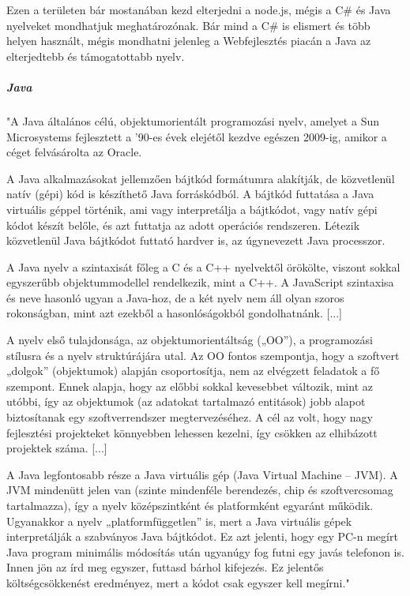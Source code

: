 Ezen a területen bár mostanában kezd elterjedni a node.js, mégis a C\# és Java nyelveket mondhatjuk meghatározónak. Bár mind a C\# is elismert és több helyen használt, mégis mondhatni jelenleg a Webfejlesztés piacán a Java az elterjedtebb és támogatottabb nyelv.

\subparagraph{Java}

"A Java általános célú, objektumorientált programozási nyelv, amelyet a Sun Microsystems fejlesztett a ’90-es évek elejétől kezdve egészen 2009-ig, amikor a céget felvásárolta az Oracle.

A Java alkalmazásokat jellemzően bájtkód formátumra alakítják, de közvetlenül natív (gépi) kód is készíthető Java forráskódból. A bájtkód futtatása a Java virtuális géppel történik, ami vagy interpretálja a bájtkódot, vagy natív gépi kódot készít belőle, és azt futtatja az adott operációs rendszeren. Létezik közvetlenül Java bájtkódot futtató hardver is, az úgynevezett Java processzor.

A Java nyelv a szintaxisát főleg a C és a C++ nyelvektől örökölte, viszont sokkal egyszerűbb objektummodellel rendelkezik, mint a C++. A JavaScript szintaxisa és neve hasonló ugyan a Java-hoz, de a két nyelv nem áll olyan szoros rokonságban, mint azt ezekből a hasonlóságokból gondolhatnánk. [...]

A nyelv első tulajdonsága, az objektumorientáltság („OO”), a programozási stílusra és a nyelv struktúrájára utal. Az OO fontos szempontja, hogy a szoftvert „dolgok” (objektumok) alapján csoportosítja, nem az elvégzett feladatok a fő szempont. Ennek alapja, hogy az előbbi sokkal kevesebbet változik, mint az utóbbi, így az objektumok (az adatokat tartalmazó entitások) jobb alapot biztosítanak egy szoftverrendszer megtervezéséhez. A cél az volt, hogy nagy fejlesztési projekteket könnyebben lehessen kezelni, így csökken az elhibázott projektek száma. [...]

A Java legfontosabb része a Java virtuális gép (Java Virtual Machine – JVM). A JVM mindenütt jelen van (szinte mindenféle berendezés, chip és szoftvercsomag tartalmazza), így a nyelv középszintként és platformként egyaránt működik. Ugyanakkor a nyelv „platformfüggetlen” is, mert a Java virtuális gépek interpretálják a szabványos Java bájtkódot. Ez azt jelenti, hogy egy PC-n megírt Java program minimális módosítás után ugyanúgy fog futni egy javás telefonon is. Innen jön az írd meg egyszer, futtasd bárhol kifejezés. Ez jelentős költségcsökkenést eredményez, mert a kódot csak egyszer kell megírni."\cite{java}

